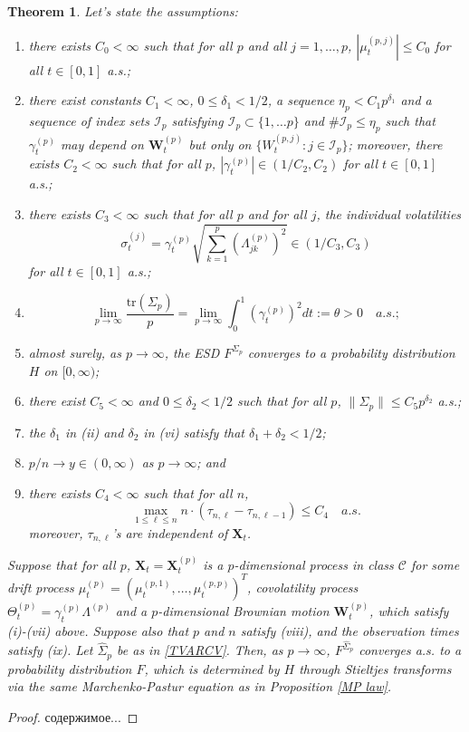 \documentclass[a4paper,11pt]{article}
\theoremstyle{plain}
\newtheorem{thm}{Theorem}[part]%
\theoremstyle{definition}
\newcommand{\tr}{\mathrm{tr}}
\begin{document}
    \begin{thm} \label{Thm 2}
    	Let's state the assumptions:
    	\begin{enumerate}
    		\item there exists $C_0 < \infty$ such that for all $p$ and all $j = 1, \dots, p$, $|\mu_t^{(p,j)}| \leq C_0$ for all $t \in [0, 1]$ a.s.;
    		\item there exist constants $C_1 < \infty$, $0 \leq \delta_1 < 1/2$, a sequence $\eta_p < C_1 p^{\delta_1}$ and a sequence of index sets $\mathcal{I}_p$ satisfying $\mathcal{I}_p \subset \{ 1, \dots p \}$ and $\# \mathcal{I}_p \leq \eta_p$ such that $\gamma_t^{(p)}$ may depend on $\mathbf{W}_t^{(p)}$ but only on $\{ W_t^{(p, j)} : j \in \mathcal{I}_p \}$; moreover, there exists $C_2 < \infty$ such that for all $p$, $|\gamma_t^{(p)}| \in (1/C_2, C_2)$ for all $t \in [0, 1]$ a.s.;
    		\item there exists $C_3 < \infty$ such that for all $p$ and for all $j$, the individual volatilities \[ \sigma_t^{(j)} = \gamma_t^{(p)}\sqrt{\sum_{k=1}^{p} (\Lambda_{jk}^{(p)})^2} \in (1/C_3, C_3)\] for all $t \in [0, 1]$ a.s.;
    		\item \[ \lim_{p \rightarrow \infty} \frac{\tr(\Sigma_p)}{p} = \lim_{p \rightarrow \infty} \int_{0}^{1} (\gamma_t^{(p)})^2 dt := \theta > 0 \quad a.s.; \]
    		\item almost surely, as $p \rightarrow \infty$, the ESD $F^{\Sigma_p}$ converges to a probability distribution $H$ on $[0, \infty)$;
    		\item there exist $C_5 < \infty$ and $0 \leq \delta_2 < 1/2$ such that for all $p$, $\| \Sigma_p \| \leq C_5 p^{\delta_2}$ a.s.;
    		\item the $\delta_1$ in (ii) and $\delta_2$ in (vi) satisfy that $\delta_1 + \delta_2 < 1/2$;
    		\item $p/n \rightarrow y \in (0, \infty) $ as $p \rightarrow \infty$; and
    		\item there exists $C_4 < \infty$ such that for all $n$,
    		\[ \max_{1 \leq \ell \leq n} n \cdot (\tau_{n, \ell} - \tau_{n, \ell - 1}) \leq C_4 \quad a.s.  \]
    		moreover, $\tau_{n, \ell}$'s are independent of $\mathbf{X}_t$.
    	\end{enumerate}    
    		Suppose that for all $p$, $\mathbf{X}_t = \mathbf{X}_t^{(p)}$ is a $p$-dimensional process in class $\mathcal{C}$ for some drift process $\mu_t^{(p)} = (\mu_t^{(p, 1)}, \dots , \mu_t^{(p, p)})^T$, covolatility process $\Theta_t^{(p)} = \gamma_t^{(p)} \Lambda^{(p)}$ and a $p$-dimensional Brownian motion $\mathbf{W}_t^{(p)}$, which satisfy (i)-(vii) above. Suppose also that $p$ and $n$ satisfy (viii), and the observation times satisfy (ix). Let $\hat{\Sigma}_p$ be as in \eqref{TVARCV}. Then, as $p \rightarrow \infty$, $F^{\hat{\Sigma}_p}$ converges a.s. to a probability distribution $F$, which is determined by $H$ through Stieltjes transforms via the same Marchenko-Pastur equation as in Proposition \ref{MP law}.
    \end{thm}
    \begin{proof}
    	содержимое...
    \end{proof}
    
\end{document}
